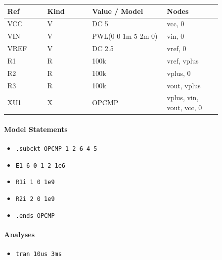 \begin{longtable}{p{0.16\linewidth}p{0.18\linewidth}p{0.30\linewidth}p{0.22\linewidth}}
\textbf{Ref} & \textbf{Kind} & \textbf{Value / Model} & \textbf{Nodes}\\
\hline
VCC & V & DC 5 & vcc, 0\\
VIN & V & PWL(0 0 1m 5 2m 0) & vin, 0\\
VREF & V & DC 2.5 & vref, 0\\
R1 & R & 100k & vref, vplus\\
R2 & R & 100k & vplus, 0\\
R3 & R & 100k & vout, vplus\\
XU1 & X & OPCMP & vplus, vin, vout, vcc, 0\\
\end{longtable}

\paragraph{Model Statements}
\begin{itemize}
  \item \texttt{.subckt OPCMP 1 2 6 4 5}
  \item \texttt{E1 6 0 1 2 1e6}
  \item \texttt{R1i 1 0 1e9}
  \item \texttt{R2i 2 0 1e9}
  \item \texttt{.ends OPCMP}
\end{itemize}

\paragraph{Analyses}
\begin{itemize}
  \item \texttt{tran 10us 3ms}
\end{itemize}
